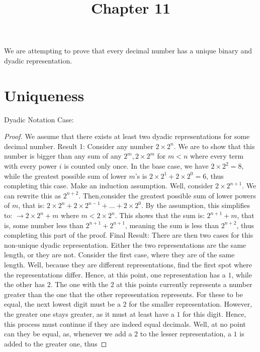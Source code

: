 \documentclass{article}
\title{Chapter 11}
\theoremstyle{definition}
\begin{document}
\maketitle
We are attempting to prove that every decimal number has a unique binary and dyadic representation.
\section*{Uniqueness}
Dyadic Notation Case:\newline
\begin{proof}
We assume that there exists at least two dyadic representations for some decimal number.
\newline Result 1: Consider any number $2\times 2^n$. We are to show that this number is bigger than any sum of any $2^m, 2\times 2^m$ for $m<n$ where every
term with every power $i$ is counted only once. In the base case, we have $2\times 2^2=8$, while the greatest possible sum of lower $m$'s is
$2\times 2^1+2\times 2^0=6$, thus completing this case. Make an induction assumption. Well, consider $2\times 2^{n+1}$. 
We can rewrite this as $2^{n+2}$. Then,consider the greatest possible sum of lower powers of $m$, that is:\newline
$2\times 2^n+2\times 2^{n-1}+...+2\times 2^0$. By the assumption, this simplifies to:\newline
$\rightarrow 2\times 2^n+m$ where $m<2\times 2^n$. This shows that the sum is:
$2^{n+1}+m$, that is, some number less than $2^{n+1}+2^{n+1}$, meaning the sum is less than $2^{n+2}$, thus completing this part of the proof.\newline
\newline Final Result: There are then two cases for this non-unique dyadic representation. Either the two representations are the same length, or they are
not. \newline Consider the first case, where they are of the same length. Well, because they are different representations, find the first spot where the
representations differ. Hence, at this point, one representation has a $1$, while the other has $2$. The one with the $2$ at this points currently
represents a number greater than the one that the other representation represents. For these to be equal, the next lowest digit must be a $2$ for the smaller
representation. However, the greater one stays greater, as it must at least have a $1$ for this digit. Hence, this process must continue if they are indeed 
equal decimals. Well, at no point can they be equal, as, whenever we add a $2$ to the lesser representation, a $1$ is added to the greater one, thus 

\end{proof}
\end{document}
